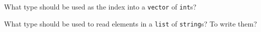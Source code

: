 %
%
\begin{question}
What type should be used as the index into a \verb|vector| of \verb|int|s?
\end{question}

\begin{question}
What type should be used to read elements in a \verb|list| of
\verb|string|s? To write them?
\end{question}
